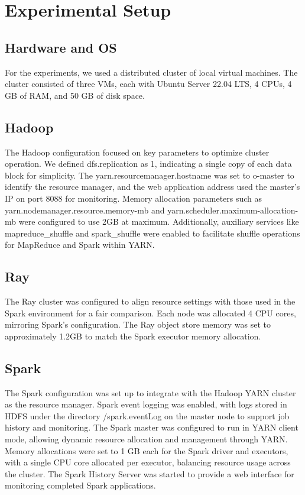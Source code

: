 \documentclass[conference]{IEEEtran}
\begin{document}
\section{Experimental Setup}

\subsection{Hardware and OS}
For the experiments, we used a distributed cluster of local virtual machines.
The cluster consisted of three VMs, each with Ubuntu Server 22.04 LTS, 4 CPUs,
4 GB of RAM, and 50 GB of disk space.

\subsection{Hadoop}
The Hadoop configuration focused on key parameters to optimize cluster operation.
We defined dfs.replication as 1, indicating a single copy of each data block for simplicity.
The yarn.resourcemanager.hostname was set to o-master to identify the resource manager,
and the web application address used the master's IP on port 8088 for monitoring.
Memory allocation parameters such as yarn.nodemanager.resource.memory-mb and
yarn.scheduler.maximum-allocation-mb were configured to use 2GB at maximum.
Additionally, auxiliary services like mapreduce\_shuffle and
spark\_shuffle were enabled to facilitate shuffle operations for MapReduce and
Spark within YARN.

\subsection{Ray}
The Ray cluster was configured to align resource settings with those
used in the Spark environment for a fair comparison. Each node was
allocated 4 CPU cores, mirroring Spark’s configuration. The Ray object store
memory was set to approximately 1.2GB to match the Spark executor memory
allocation.

\subsection{Spark}
The Spark configuration was set up to integrate with the Hadoop YARN
cluster as the resource manager. Spark event logging was enabled, with
logs stored in HDFS under the directory /spark.eventLog on the master node to
support job history and monitoring. The Spark master was configured to
run in YARN client mode, allowing dynamic resource allocation and management
through YARN. Memory allocations were set to 1 GB each for the Spark
driver and executors, with a single CPU core allocated per executor,
balancing resource usage across the cluster. The Spark History Server was
started to provide a web interface for monitoring completed Spark applications.
\end{document}
